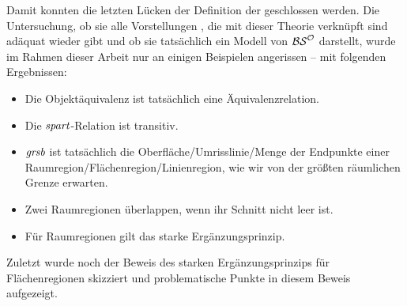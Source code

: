     Damit
    konnten die letzten Lücken der Definition der \strukt geschlossen werden. 
    Die Untersuchung, ob sie alle Vorstellungen , die mit dieser Theorie verknüpft sind adäquat wieder gibt und ob sie tatsächlich ein Modell von $\mathcal{BS}^{\mathcal{O}}$ darstellt, wurde im Rahmen dieser Arbeit nur an einigen Beispielen angerissen -- mit folgenden Ergebnissen:
    \begin{itemize}
        \item Die Objektäquivalenz ist tatsächlich eine Äquivalenzrelation.
        \item Die $\mathit{spart}$-Relation ist transitiv.
        \item $\mathit{gr\hspace*{-0.25ex}sb}$ ist tatsächlich die Oberfläche/Umrisslinie/Menge der Endpunkte einer Raumregion/Flächenregion/Linienregion, wie wir von der größten räumlichen Grenze erwarten.
        \item Zwei Raumregionen überlappen, wenn ihr Schnitt nicht leer ist.
        \item Für Raumregionen gilt das starke Ergänzungsprinzip.
    \end{itemize}
    Zuletzt wurde noch der Beweis des starken Ergänzungsprinzips für Flächenregionen skizziert und problematische Punkte in diesem Beweis aufgezeigt.


